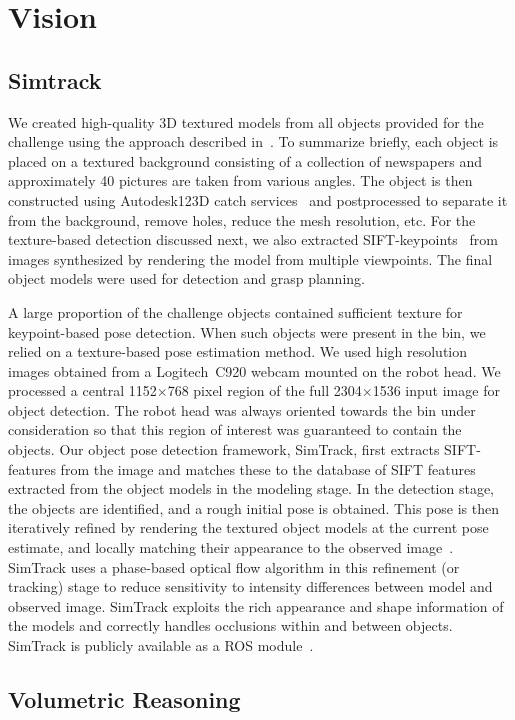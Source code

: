 \section{Vision}
\label{sec:vision}

\subsection{Simtrack}

We created high-quality 3D textured models from all objects provided for the challenge using the approach described in~\cite{pokorny_2017}. To summarize briefly, each object is placed on a textured background consisting of a collection of newspapers and approximately 40 pictures are taken from various angles. The object is then constructed using Autodesk123D catch services~\cite{autodesk} and postprocessed to separate it from the background, remove holes, reduce the mesh resolution, etc. For the texture-based detection discussed next, we also extracted SIFT-keypoints~\cite{lowe04} from images synthesized by rendering the model from multiple viewpoints. The final object models were used for detection and grasp planning.

A large proportion of the challenge objects contained sufficient texture for keypoint-based pose detection. When such objects were present in the bin, we relied on a texture-based pose estimation method. We used high resolution images obtained from a Logitech~C920 webcam mounted on the robot head. We processed a central 1152$\times$768 pixel region of the full 2304$\times$1536 input image for object detection. The robot head was always oriented towards the bin under consideration so that this region of interest was guaranteed to contain the objects. Our object pose detection framework, SimTrack, first extracts SIFT-features from the image and matches these to the database of SIFT features extracted from the object models in the modeling stage. In the detection stage, the objects are identified, and a rough initial pose is obtained. This pose is then iteratively refined by rendering the textured object models at the current pose  estimate, and locally matching their appearance to the observed image~\cite{pauwels_simtrack_2015}. SimTrack uses a phase-based optical flow algorithm in this refinement (or tracking) stage to reduce sensitivity to intensity differences between model and observed image. SimTrack exploits the rich appearance and shape information of the models and correctly handles occlusions within and between objects. SimTrack is publicly available as a ROS module~\cite{simtrack_github}.


\subsection{Volumetric Reasoning}

